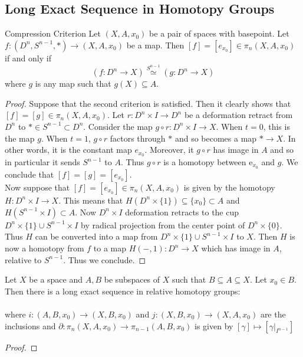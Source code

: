 \documentclass[a4paper]{article}
\begin{document}
\subsection{Long Exact Sequence in Homotopy Groups}
\begin{lmm}{Compression Criterion}{} Let $(X,A,x_0)$ be a pair of spaces with basepoint. Let $f:(D^n,S^{n-1},\ast)\to(X,A,x_0)$ be a map. Then $[f]=[e_{x_0}]\in\pi_n(X,A,x_0)$ if and only if $$(f:D^n\to X)\overset{S^{n-1}}{\simeq}(g:D^n\to X)$$ where $g$ is any map such that $g(X)\subseteq A$. 
\begin{proof}
Suppose that the second criterion is satisfied. Then it clearly shows that $[f]=[g]\in\pi_n(X,A,x_0)$. Let $r:D^n\times I\to D^n$ be a deformation retract from $D^n$ to $\ast\in S^{n-1}\subset D^n$. Consider the map $g\circ r:D^n\times I\to X$. When $t=0$, this is the map $g$. When $t=1$, $g\circ r$ factors through $\ast$ and so becomes a map $\ast\to X$. In other words, it is the constant map $e_{x_0}$. Moreover, it $g\circ r$ has image in $A$ and so in particular it sends $S^{n-1}$ to $A$. Thus $g\circ r$ is a homotopy between $\text{e}_{x_0}$ and $g$. We conclude that $[f]=[g]=[e_{x_0}]$. \\

Now suppose that $[f]=[e_{x_0}]\in\pi_n(X,A,x_0)$ is given by the homotopy $H:D^n\times I\to X$. This means that $H(D^n\times\{1\})\subseteq\{x_0\}\subset A$ and $H(S^{n-1}\times I)\subset A$. Now $D^n\times I$ deformation retracts to the cup $D^n\times\{1\}\cup S^{n-1}\times I$ by radical projection from the center point of $D^n\times\{0\}$. Thus $H$ can be converted into a map from $D^n\times\{1\}\cup S^{n-1}\times I$ to $X$. Then $H$ is now a homotopy from $f$ to a map $H(-,1):D^n\to X$ which has image in $A$, relative to $S^{n-1}$. Thus we conclude. 
\end{proof}
\end{lmm}

\begin{thm}{}{} Let $X$ be a space and $A,B$ be subspaces of $X$ such that $B\subseteq A\subseteq X$. Let $x_0\in B$. Then there is a long exact sequence in relative homotopy groups: \\
\\
where $i:(A,B,x_0)\to(X,B,x_0)$ and $j:(X,B,x_0)\to(X,A,x_0)$ are the inclusions and $\partial:\pi_n(X,A,x_0)\to\pi_{n-1}(A,B,x_0)$ is given by $[\gamma]\mapsto[\gamma|_{I^{n-1}}]$ 
\begin{proof}{}{}
\end{proof}
\end{thm}
\end{document}
